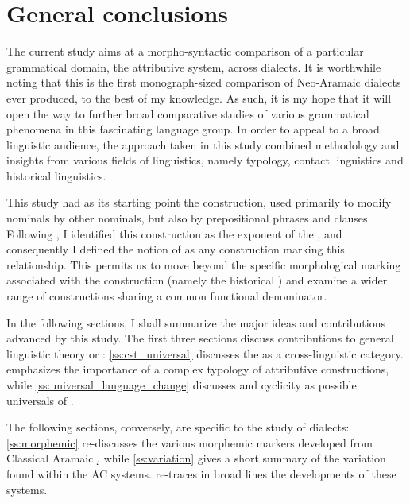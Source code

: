 





\chapter{General conclusions}

The current study aims at a morpho-syntactic comparison of a particular grammatical domain, the attributive system, across  dialects. It is worthwhile noting that this is the first monograph-sized comparison of Neo-Aramaic dialects ever produced, to the best of my knowledge. As such, it is my hope that it will open the way to further broad comparative studies of various grammatical phenomena in this fascinating language group. In order to appeal to a broad linguistic audience, the approach taken in this study combined methodology and insights from various fields of linguistics, namely typology, contact linguistics and historical linguistics. 


This study had as its starting point the    construction, used primarily to modify nominals by other nominals, but also by prepositional phrases and clauses. Following \citet{GoldenbergAttribution}, I identified this construction as the exponent of the , and consequently I defined the notion of  as any construction marking this relationship. This permits us to move beyond the specific morphological marking associated with the  construction (namely the historical \cst*) and examine a wider range of constructions sharing a common functional denominator. 

In the following sections, I shall summarize the major ideas and contributions advanced by this study. The first three sections discuss contributions to general linguistic theory or : \ref{ss:cst_universal} discusses the \cst* as a cross-linguistic category.   emphasizes the importance of a complex typology of attributive constructions, while \ref{ss:universal_language_change} discusses  and cyclicity as possible universals of .

The following sections, conversely, are specific to the study of  dialects: \ref{ss:morphemic} re-discusses the various morphemic markers developed from Classical Aramaic \d, while \ref{ss:variation} gives a short summary of the variation found within the  AC systems.  re-traces in broad lines the developments of these systems.

